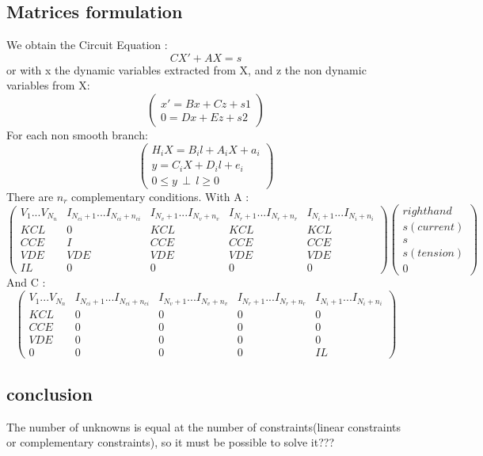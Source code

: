 \documentclass[10pt]{article}
\begin{document}
\subsection{Matrices formulation}
We obtain the Circuit Equation :
\[CX'+AX = s\]
or with x the dynamic variables extracted from X, and z the non dynamic variables from X:
\[\left(\begin{array}{c}
x'=Bx+Cz+s1\\
0 =Dx+Ez+s2
\end{array}\right)\]
For each non smooth branch:
\[\left(\begin{array}{c}
H_{i}X = B_{i}l+A_{i}X + a_{i}\\
y=C_{i}X+D_{i}l+e_{i}\\
0 \leq y \, \perp \, l \geq 0
\end{array}\right)\]
There are $n_{r}$ complementary conditions.
\newline
With A :\\
\[
\left( \begin{array}{ccccc}
V_{1}...V_{N_{n}} & I_{N_{ci}+1}...I_{N_{ci} + n_{ci}} & I_{N_{v}+1}...I_{N_{v} +
  n_{v}}&I_{N_{r}+1}...I_{N_{r} + n_{r}} & I_{N_{i}+1}...I_{N_{i} + n_{i}} \\
\hline
KCL & 0& KCL & KCL&KCL\\
CCE & I & CCE & CCE&CCE\\
VDE & VDE & VDE & VDE&VDE\\
IL&0&0&0&0
\end{array} \right)
\left( \begin{array}{c}
right hand\\
\hline
s(current)\\
s\\
s(tension)\\
0

  \end{array}\right)
\]
And C :
\[
\left( \begin{array}{ccccc}
V_{1}...V_{N_{n}} & I_{N_{ci}+1}...I_{N_{ci} + n_{ci}} & I_{N_{v}+1}...I_{N_{v} +
  n_{v}}&I_{N_{r}+1}...I_{N_{r} + n_{r}} & I_{N_{i}+1}...I_{N_{i} + n_{i}} \\
\hline
KCL & 0& 0 & 0&0\\
CCE & 0 & 0 & 0&0\\
VDE & 0 & 0 & 0&0\\
0&0&0&0&IL
\end{array} \right)
\]

\subsection{conclusion}
The number of unknowns is equal at the number of constraints(linear constraints or complementary
constraints), so it must be possible to solve it???
\newpage
\end{document}
